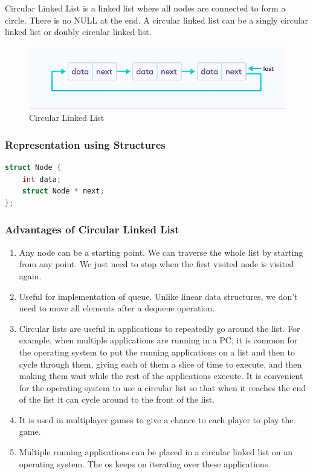 \documentclass[11pt]{article}
\begin{document}
Circular Linked List is a linked list where all nodes are connected to form a circle. There is no NULL at the end. A circular linked list can be a singly circular linked list or doubly circular linked list.

\begin{figure}[H]
	\centering
	\includegraphics[scale = 0.5]{cll.png}
	\caption{Circular Linked List}
\end{figure}

\subsubsection{Representation using Structures}
\begin{lstlisting}[language=C]
	struct Node {
    int data;
    struct Node * next;
};
\end{lstlisting}

\subsubsection{Advantages of Circular Linked List}

\begin{enumerate}
	\item Any node can be a starting point. We can traverse the whole list by starting from any point. We just need to stop when the first visited node is visited again.
	\item Useful for implementation of queue. Unlike linear data structures, we don’t need to move all elements after a dequeue operation.
	\item Circular lists are useful in applications to repeatedly go around the list. For example, when multiple applications are running in a PC, it is common for the operating system to put the running applications on a list and then to cycle through them, giving each of them a slice of time to execute, and then making them wait while the rest of the applications execute. It is convenient for the operating system to use a circular list so that when it reaches the end of the list it can cycle around to the front of the list.
	\item It is used in multiplayer games to give a chance to each player to play the game.
	\item Multiple running applications can be placed in a circular linked list on an operating system. The os keeps on iterating over these applications.
\end{enumerate}
\end{document}
